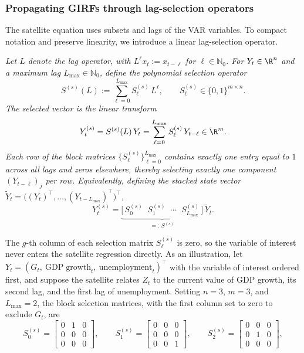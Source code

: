 \subsubsection{Propagating GIRFs through lag-selection operators}
\label{sec:lag_section}
The satellite equation uses subsets and lags of the VAR variables. To compact
notation and preserve linearity, we introduce a linear lag-selection operator.
\begin{defn}
\label{def:linear-operator-lags}
\textit{Let $L$ denote the lag operator, with $L^\ell x_t := x_{t-\ell}$
for $\ell \in \mathbb N_0$. For $Y_t \in \R^{n}$ and a maximum lag
$L_{\max} \in \mathbb N_0$, define the polynomial selection operator}
\begin{equation}
    S^{(s)}(L) := \sum_{\ell=0}^{L_{\max}} S^{(s)}_{\ell}\,L^{\ell},
    \qquad S^{(s)}_{\ell} \in \{0,1\}^{m\times n}.
\end{equation}
\textit{The selected vector is the linear transform}
\begin{equation}
    Y_t^{(s)}
    = S^{(s)}(L)\,Y_t
    = \sum_{\ell=0}^{L_{\max}} S^{(s)}_{\ell}\,Y_{t-\ell}
    \in \R^{m}.
\end{equation}
\textit{Each row of the block matrices $\{S^{(s)}_{\ell}\}_{\ell=0}^{L_{\max}}$
contains exactly one entry equal to $1$ across all lags and zeros
elsewhere, thereby selecting exactly one component $(Y_{t-\ell})_j$ per row.
Equivalently, defining the stacked state vector
$\widetilde Y_t = \big( (Y_t)^\top, \ldots, (Y_{t-L_{\max}})^\top \big)^\top$,}
\begin{equation}
    Y_t^{(s)}
    = \underbrace{\big[\,S^{(s)}_{0}\;\;S^{(s)}_{1}\;\;\cdots\;\;S^{(s)}_{L_{\max}}\,\big]}_{=:\,S^{(s)}}
    \,\widetilde Y_t.
\end{equation}
\end{defn}
\medskip
The $g$-th column of each selection matrix $S^{(s)}_\ell$ is zero, so the
variable of interest never enters the satellite regression directly.
\medskip
As an illustration, let
$Y_t = (G_t,\ \mathrm{GDP\;growth}_t,\ \mathrm{unemployment}_t)^\top$
with the variable of interest ordered first, and suppose the satellite relates
$Z_t$ to the current value of GDP growth, its second lag, and the first lag of
unemployment. Setting $n=3$, $m=3$, and $L_{\max}=2$, the block selection
matrices, with the first column set to zero to exclude $G_t$, are
\begin{equation}
    S^{(s)}_{0}=\begin{bmatrix}
    0&1&0\\[2pt] 0&0&0\\[2pt] 0&0&0
    \end{bmatrix},\qquad
    S^{(s)}_{1}=\begin{bmatrix}
    0&0&0\\[2pt] 0&0&0\\[2pt] 0&0&1
    \end{bmatrix},\qquad
    S^{(s)}_{2}=\begin{bmatrix}
    0&0&0\\[2pt] 0&1&0\\[2pt] 0&0&0
    \end{bmatrix},
\end{equation}
